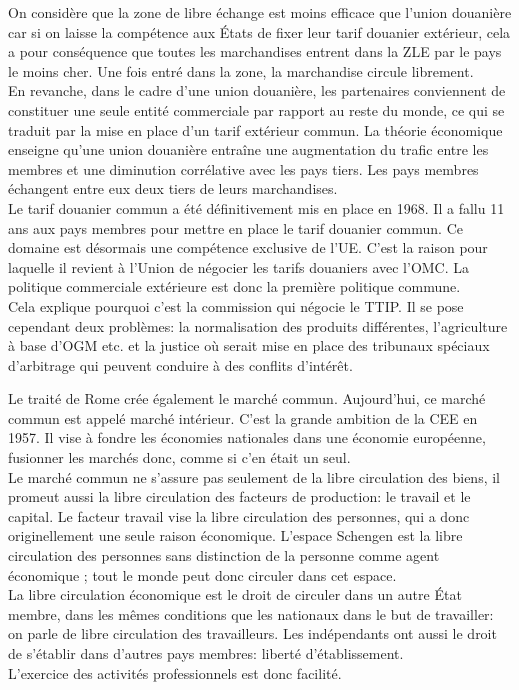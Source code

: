 \documentclass[12pt, a4paper, openany]{book}
\begin{document}
On considère que la zone de libre échange est moins efficace que l'union douanière car si on laisse la compétence aux États de fixer leur tarif douanier extérieur, cela a pour conséquence que toutes les marchandises entrent dans la ZLE par le pays le moins cher. Une fois entré dans la zone, la marchandise circule librement. \\
En revanche, dans le cadre d'une union douanière, les partenaires conviennent de constituer une seule entité commerciale par rapport au reste du monde, ce qui se traduit par la mise en place d'un tarif extérieur commun. La théorie économique enseigne qu'une union douanière entraîne une augmentation du trafic entre les membres et une diminution corrélative avec les pays tiers. Les pays membres échangent entre eux deux tiers de leurs marchandises. \\
Le tarif douanier commun a été définitivement mis en place en 1968. Il a fallu 11 ans aux pays membres pour mettre en place le tarif douanier commun. Ce domaine est désormais une compétence exclusive de l'UE. C'est la raison pour laquelle il revient à l'Union de négocier les tarifs douaniers avec l'OMC. La politique commerciale extérieure est donc la première politique commune. \\
Cela explique pourquoi c'est la commission qui négocie le TTIP. Il se pose cependant deux problèmes: la normalisation des produits différentes, l'agriculture à base d'OGM etc. et la justice où serait mise en place des tribunaux spéciaux d'arbitrage qui peuvent conduire à des conflits d'intérêt. 


Le traité de Rome crée également le marché commun. Aujourd'hui, ce marché commun est appelé marché intérieur. C'est la grande ambition de la CEE en 1957. Il vise à fondre les économies nationales dans une économie européenne, fusionner les marchés donc, comme si c'en était un seul. \\
Le marché commun ne s'assure pas seulement de la libre circulation des biens, il promeut aussi la libre circulation des facteurs de production: le travail et le capital. Le facteur travail vise la libre circulation des personnes, qui a donc originellement une seule raison économique. L'espace Schengen est la libre circulation des personnes sans distinction de la personne comme agent économique ; tout le monde peut donc circuler dans cet espace. \\
La libre circulation économique est le droit de circuler dans un autre État membre, dans les mêmes conditions que les nationaux dans le but de travailler: on parle de libre circulation des travailleurs. Les indépendants ont aussi le droit de s'établir dans d'autres pays membres: liberté d'établissement. \\
L'exercice des activités professionnels est donc facilité. 
\end{document}
